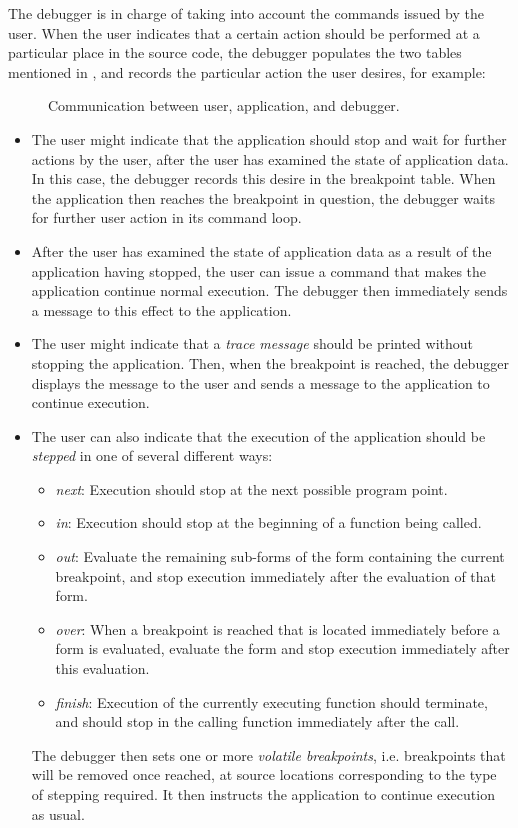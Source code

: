 The debugger is in charge of taking into account the commands issued
by the user.  When the user indicates that a certain action should be
performed at a particular place in the source code, the debugger
populates the two tables mentioned in ,
and records the particular action the user desires, for example:

\begin{figure}
\begin{center}
\end{center}
\caption{\label{fig-communication}
Communication between user, application, and debugger.}
\end{figure}

\begin{itemize}
\item The user might indicate that the application should stop and
  wait for further actions by the user, after the user has examined
  the state of application data.  In this case, the debugger records
  this desire in the breakpoint table.  When the application then
  reaches the breakpoint in question, the debugger waits for further
  user action in its command loop.
\item After the user has examined the state of application data as a
  result of the application having stopped, the user can issue a
  command that makes the application continue normal execution.  The
  debugger then immediately sends a message to this effect to the
  application.
\item The user might indicate that a \emph{trace message} should be
  printed without stopping the application.  Then, when the breakpoint
  is reached, the debugger displays the message to the user and sends
  a message to the application to continue execution.
\item The user can also indicate that the execution of the application
  should be \emph{stepped} in one of several different ways:
  \begin{itemize}
  \item \emph{next}: Execution should stop at the next possible
    program point.
  \item \emph{in}: Execution should stop at the beginning of a
    function being called.
  \item \emph{out}: Evaluate the remaining sub-forms of the form
    containing the current breakpoint, and stop execution immediately
    after the evaluation of that form.
  \item \emph{over}: When a breakpoint is reached that is located
    immediately before a form is evaluated, evaluate the form and stop
    execution immediately after this evaluation.
  \item \emph{finish}:  Execution of the currently executing function
    should terminate, and should stop in the calling function
    immediately after the call.
  \end{itemize}
  The debugger then sets one or more \emph{volatile
    breakpoints}, i.e. breakpoints that will be removed once reached,
  at source locations corresponding to the type of stepping required.
  It then instructs the application to continue execution as usual.
\end{itemize}

